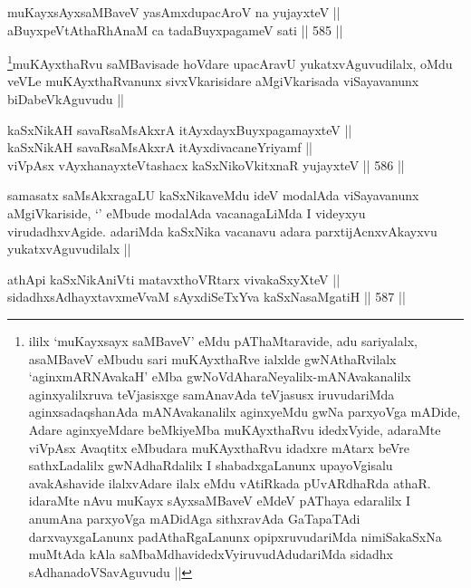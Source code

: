 \begin{shl}
muKayxsAyxsaMBaveV yasAmxdupacAroV na yujayxteV || \\
aBuyxpeVtAthaRhAnaM ca tadaBuyxpagameV sati ||  585 ||  
\end{shl}

\begin{artha}
\footnote{ililx `muKayxsayx saMBaveV' eMdu pAThaMtaravide, adu sariyalalx, asaMBaveV eMbudu sari muKAyxthaRve ialxlde gwNAthaRvilalx `aginxmARNAvakaH' eMba gwNoVdAharaNeyalilx-mANAvakanalilx aginxyalilxruva teVjasisxge samAnavAda teVjasusx iruvudariMda aginxsadaqshanAda mANAvakanalilx aginxyeMdu gwNa parxyoVga mADide, Adare aginxyeMdare beMkiyeMba muKAyxthaRvu idedxVyide, adaraMte viVpAsx Avaqtitx eMbudara muKAyxthaRvu idadxre mAtarx beVre sathxLadalilx gwNAdhaRdalilx I shabadxgaLanunx upayoVgisalu avakAshavide ilalxvAdare ilalx eMdu vAtiRkada pUvARdhaRda athaR. idaraMte nAvu muKayx sAyxsaMBaveV eMdeV pAThaya edaralilx I anumAna parxyoVga mADidAga sithxravAda GaTapaTAdi darxvayxgaLanunx padAthaRgaLanunx opipxruvudariMda nimiSakaSxNa muMtAda kAla saMbaMdhavidedxVyiruvudAdudariMda sidadhx sAdhanadoVSavAguvudu ||}muKAyxthaRvu saMBavisade hoVdare upacAravU yukatxvAguvudilalx, oMdu veVLe muKAyxthaRvanunx sivxVkarisidare aMgiVkarisada viSayavanunx biDabeVkAguvudu ||
\end{artha}


\begin{shl}
kaSxNikAH  savaRsaMsAkxrA itAyxdayxBuyxpagamayxteV || \\
kaSxNikAH  savaRsaMsAkxrA itAyxdivacaneYriyamf || \\
viVpAsx vAyxhanayxteV\s tashacx kaSxNikoVkitxnaR yujayxteV ||  586 ||  
\end{shl}

\begin{artha}
samasatx saMsAkxragaLU kaSxNikaveMdu ideV modalAda viSayavanunx aMgiVkariside, `\stext' eMbude modalAda vacanagaLiMda I videyxyu virudadhxvAgide. adariMda kaSxNika vacanavu adara parxtijAcnxvAkayxvu yukatxvAguvudilalx ||
\end{artha}

\begin{shl}
athApi kaSxNikAniVti matavxthoVR\s tarx vivakaSxyXteV || \\
sidadhxsAdhayxtavxmeVvaM sAyxdiSeTxYva kaSxNasaMgatiH ||  587 ||  
\end{shl}
				
